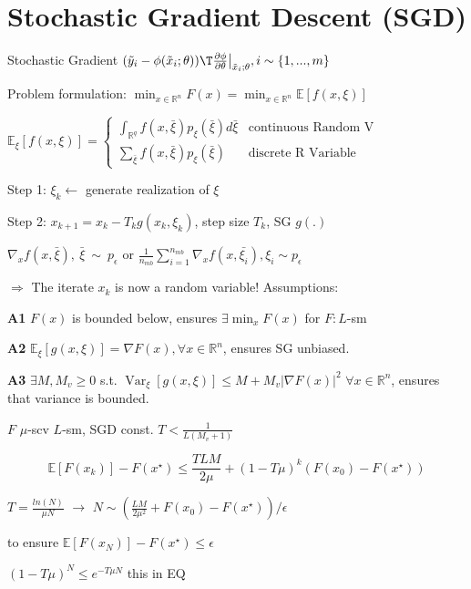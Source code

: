 \section{Stochastic Gradient Descent (SGD)}

Stochastic Gradient
$(\tilde{y}_i - \phi(\tilde{x}_i;\theta))\T
	\frac{\partial\phi}{\partial\theta}\big|_{\tilde{x}_i;\theta}
	,i\sim\{1,...,m\}$

Problem formulation:
$\min _{x \in \mathbb{R}^{n}} F(x)
	= \min _{x \in \mathbb{R}^{n}} \mathbb{E} [f(x,\xi)]$




$\mathbb{E}_\xi[f(x,\xi)]=
	\begin{cases}
		\int_{\mathbb{R}^{q}}f(x,\bar{\xi})p_\xi(\bar\xi)d\bar{\xi}
		 & \text{continuous Random V}
		\\
		\sum_{\bar{\xi}}f(x,\bar{\xi})p_\xi(\bar\xi)
		 & \text{discrete R Variable}
	\end{cases}$

Step 1: $\xi_k \leftarrow$ generate realization of $\xi$

Step 2: $x_{k+1} = x_k - T_k  g(x_k,\xi_k)$, step size $T_k$, SG $g(.)$

$\nabla_xf(x,\bar{\xi}),\ \bar{\xi}\ \sim \ p_\epsilon$
or
$\frac{1}{n_{mb}}\sum_{i=1}^{n_{mb}}\nabla_xf(x,\bar{\xi_i}), \xi_i \sim p_\epsilon$

$\Rightarrow$ The iterate $x_k$ is now a random variable!
Assumptions:

\textbf{A1} $F(x)$ is bounded below,
ensures $\exists\min_{x}F(x)$ for $F:L$-sm

\textbf{A2} $\mathbb{E}_\xi[g(x,\xi)]=\nabla F(x),
	\forall x \in \mathbb{R}^{n}$,
ensures SG unbiased.

\textbf{A3} $\exists M,M_v\ge0$ s.t.
$\operatorname{Var}_{\xi}[g(x,\xi)]\le
	M+M_v|\nabla F(x)|^2$
$\forall x\in\mathbb{R}^{n}$,
ensures that variance is bounded.

\begin{proposition}
	$F$ $\mu$-scv $L$-sm,
	SGD const.
	$T<\frac{1}{L(M_v + 1)}$

	$$\mathbb{E}[F(x_k)]-F(x^\star)\le
		\frac{TLM}{2\mu}+(1-T\mu)^k(F(x_0)-F(x^\star))$$

	$T=\frac{ln(N)}{\mu N}$
	$\rightarrow$
	$N\sim\left(\frac{LM}{2\mu^2}+F(x_0)-F(x^\star)\right)/\epsilon$

	to ensure
	$\mathbb{E}[F(x_N)] - F(x^\star)\le\epsilon$
\end{proposition}

$(1-T\mu)^N\le e^{-T\mu N}$ this  in EQ

